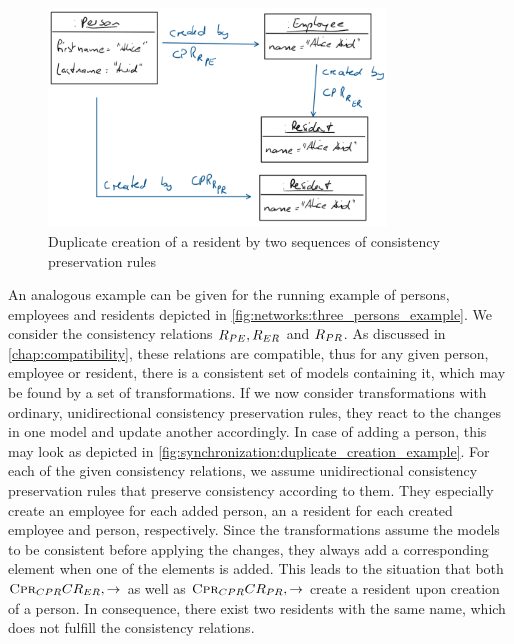 \begin{figure}
    \centering
    \includegraphics[width=0.8\textwidth]{figures/correctness/synchronization/duplicate_creation_example.png}    
    \caption{Duplicate creation of a resident by two sequences of consistency preservation rules}
    \label{fig:synchronization:duplicate_creation_example}
\end{figure}

An analogous example can be given for the running example of persons, employees and residents depicted in \autoref{fig:networks:three_persons_example}.
We consider the consistency relations $R_{PE}, R_{ER}$ and $R_{PR}$.
As discussed in \autoref{chap:compatibility}, these relations are compatible, thus for any given person, employee or resident, there is a consistent set of models containing it, which may be found by a set of transformations.
If we now consider transformations with ordinary, unidirectional consistency preservation rules, they react to the changes in one model and update another accordingly.
In case of adding a person, this may look as depicted in \autoref{fig:synchronization:duplicate_creation_example}.
For each of the given consistency relations, we assume unidirectional consistency preservation rules that preserve consistency according to them.
They especially create an employee for each added person, an a resident for each created employee and person, respectively.
Since the transformations assume the models to be consistent before applying the changes, they always add a corresponding element when one of the elements is added.
This leads to the situation that both $\textsc{Cpr}_{CPR}{CR_{ER},\rightarrow}$ as well as $\textsc{Cpr}_{CPR}{CR_{PR},\rightarrow}$ create a resident upon creation of a person.
In consequence, there exist two residents with the same name, which does not fulfill the consistency relations.

